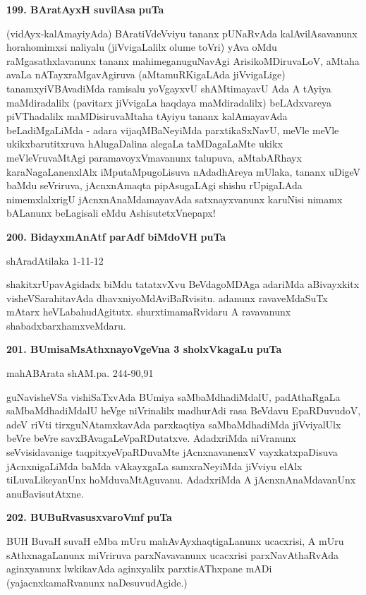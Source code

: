 \medskip
\noindent
\textbf{199. BAratAyxH suvilAsa} \hfill{\bf puTa }

\smallskip
(vidAyx-kalAmayiyAda) BAratiVdeVviyu tananx pUNaRvAda kalAvilAsavanunx horahomimxsi naliyalu (jiVvigaLalilx olume toVri) yAva oMdu raMgasathxlavanunx tananx mahimeganuguNavAgi ArisikoMDiruvaLoV, aMtaha avaLa nATayxraMgavAgiruva (aMtamuRKigaLAda jiVvigaLige) tanamxyiVBAvadiMda ramisalu yoVgayxvU shAMtimayavU Ada A tAyiya maMdiradalilx (pavitarx jiVvigaLa haqdaya maMdiradalilx) beLAdxvareya piVThadalilx maMDisiruvaMtaha tAyiyu tananx kalAmayavAda beLadiMgaLiMda - adara vijaqMBaNeyiMda parxtikaSxNavU, meVle meVle ukikxbarutitxruva hAlugaDalina alegaLa taMDagaLaMte ukikx meVleVruvaMtAgi paramavoyxVmavanunx talupuva, aMtabARhayx karaNagaLanenxlAlx iMputaMpugoLisuva nAdadhAreya mUlaka, tananx uDigeV baMdu seVriruva, jAcnxnAmaqta pipAsugaLAgi shishu rUpigaLAda nimemxlalxrigU jAcnxnAnaMdamayavAda satxnayxvanunx karuNisi nimamx bALanunx beLagisali eMdu AshisutetxVnepapx!

\medskip
\noindent
\textbf{200. BidayxmAnAtf parAdf biMdoVH} \hfill{\bf puTa }

\hfill{shAradAtilaka 1-11-12}

\smallskip
shakitxrUpavAgidadx biMdu tatatxvXvu BeVdagoMDAga adariMda aBivayxkitx visheVSarahitavAda dhavxniyoMdAviBaRvisitu. adanunx ravaveMdaSuTx mAtarx heVLabahudAgitutx. shurxtimamaRvidaru A ravavanunx shabadxbarxhamxveMdaru.

\medskip
\noindent
\textbf{201. BUmisaMsAthxnayoVgeVna 3 sholxVkagaLu} \hfill{\bf puTa }

\hfill{mahABArata shAM.pa. 244-90,91}

\smallskip
guNavisheVSa vishiSaTxvAda BUmiya saMbaMdhadiMdalU, padAthaRgaLa saMbaMdhadiMdalU heVge niVrinalilx madhurAdi rasa BeVdavu EpaRDuvudoV, adeV riVti tirxguNAtamxkavAda parxkaqtiya saMbaMdhadiMda jiVviyalUlx beVre beVre savxBAvagaLeVpaRDutatxve. AdadxriMda niVranunx seVvisidavanige taqpitxyeVpaRDuvaMte jAcnxnavanenxV vayxkatxpaDisuva jAcnxnigaLiMda baMda vAkayxgaLa samxraNeyiMda jiVviyu elAlx tiLuvaLikeyanUnx hoMduvaMtAguvanu. AdadxriMda A jAcnxnAnaMdavanUnx anuBavisutAtxne.

\medskip
\noindent
\textbf{202. BUBuRvasusxvaroVmf} \hfill{\bf puTa }

\smallskip
BUH BuvaH suvaH eMba mUru mahAvAyxhaqtigaLanunx ucacxrisi, A mUru sAthxnagaLanunx miVriruva parxNavavanunx ucacxrisi parxNavAthaRvAda aginxyanunx lwkikavAda aginxyalilx parxtisAThxpane mADi (yajacnxkamaRvanunx naDesuvudAgide.)


